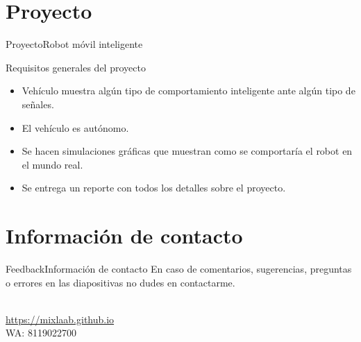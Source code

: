 \documentclass[10pt]{beamer}
\newcommand{\chref}[2]{%
  \href{#1}{{\usebeamercolor[bg]{Aalborg}#2}}%
}
\begin{document}
\section{Proyecto}
\begin{frame}{Proyecto}{Robot móvil inteligente}
\begin{block}{Requisitos generales del proyecto}
    \begin{itemize}
        \item Vehículo muestra algún tipo de comportamiento inteligente ante algún tipo de señales.
        \item El vehículo es autónomo.
        \item Se hacen simulaciones gráficas que muestran como se comportaría el robot en el mundo real.
        \item Se entrega un reporte con todos los detalles sobre el proyecto.
    \end{itemize}
\end{block}

\end{frame}

\section{Información de contacto}
\begin{frame}{Feedback}{Información de contacto}
En caso de comentarios, sugerencias, preguntas o errores en las diapositivas no dudes en contactarme.
  \begin{center}
    \insertauthor\\
    \chref{https://mixlaab.github.io}{https://mixlaab.github.io}\\
    WA: 8119022700\\
  \end{center}
\end{frame}

{\aauwavesbg%
\begin{frame}%
\end{frame}}
\end{document}
